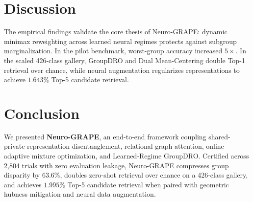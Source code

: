 \documentclass[conference]{IEEEtran}
\begin{document}
\section{Discussion}

The empirical findings validate the core thesis of Neuro-GRAPE: dynamic minimax reweighting across learned neural regimes protects against subgroup marginalization. In the pilot benchmark, worst-group accuracy increased $5\times$. In the scaled 426-class gallery, GroupDRO and Dual Mean-Centering double Top-1 retrieval over chance, while neural augmentation regularizes representations to achieve $1.643\%$ Top-5 candidate retrieval.

\section{Conclusion}

We presented \textbf{Neuro-GRAPE}, an end-to-end framework coupling shared-private representation disentanglement, relational graph attention, online adaptive mixture optimization, and Learned-Regime GroupDRO. Certified across 2,804 trials with zero evaluation leakage, Neuro-GRAPE compresses group disparity by $63.6\%$, doubles zero-shot retrieval over chance on a 426-class gallery, and achieves $1.995\%$ Top-5 candidate retrieval when paired with geometric hubness mitigation and neural data augmentation.



\end{document}
